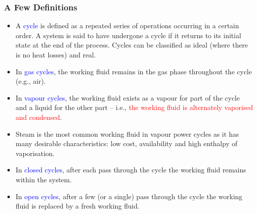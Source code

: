 \documentclass[10pt,compress]{beamer}
\newcommand{\red}{\textcolor{red}}
\begin{document}
\begin{frame}
 \frametitle{A Few Definitions}
 \begin{itemize}
  \item <1-> A \textcolor{blue}{cycle} is defined as a repeated series of operations occurring in a certain order. A system is said to have undergone a cycle if it returns to its initial state at the end of the process.  Cycles can be classified as ideal (where there is no heat losses) and real. 
  \item <2-> In \textcolor{blue}{gas cycles}, the working fluid remains in the gas phase throughout the cycle (e.g., air).
  \item <3-> In \textcolor{blue}{vapour cycles}, the working fluid exists as a vapour for part of the cycle and a liquid for the other part -- i.e., \red{the working fluid is alternately vaporised and condensed}.
  \item <4-> Steam is the most common working fluid in vapour power cycles as it has many desirable characteristics: low cost, availability and high enthalpy of vaporisation.
  \item <5-> In \textcolor{blue}{closed cycles}, after each pass through the cycle the working fluid remains within the system.
  \item <6-> In \textcolor{blue}{open cycles}, after a few (or a single) pass through the cycle the working fluid is replaced by a fresh working fluid.
 \end{itemize}
\end{frame}
\end{document}
